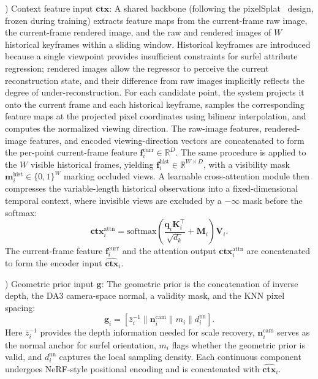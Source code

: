 \documentclass[letterpaper,journal]{IEEEtran}
\begin{document}
\vspace{0.35em}
) Context feature input $\mathbf{ctx}$: A shared backbone (following the pixelSplat~\cite{charatan2024pixelsplat} design, frozen during training) extracts feature maps from the current-frame raw image, the current-frame rendered image, and the raw and rendered images of $W$ historical keyframes within a sliding window. Historical keyframes are introduced because a single viewpoint provides insufficient constraints for surfel attribute regression; rendered images allow the regressor to perceive the current reconstruction state, and their difference from raw images implicitly reflects the degree of under-reconstruction. For each candidate point, the system projects it onto the current frame and each historical keyframe, samples the corresponding feature maps at the projected pixel coordinates using bilinear interpolation, and computes the normalized viewing direction. The raw-image features, rendered-image features, and encoded viewing-direction vectors are concatenated to form the per-point current-frame feature $\mathbf{f}_i^{\text{curr}} \in \mathbb{R}^{D}$. The same procedure is applied to the $W$ visible historical frames, yielding $\mathbf{f}_i^{\text{hist}} \in \mathbb{R}^{W \times D}$, with a visibility mask $\mathbf{m}_i^{\text{hist}} \in \{0,1\}^{W}$ marking occluded views. A learnable cross-attention module then compresses the variable-length historical observations into a fixed-dimensional temporal context, where invisible views are excluded by a $-\infty$ mask before the softmax:
%
\begin{equation}
\mathbf{ctx}_i^{\text{attn}} = \text{softmax}\!\left(\frac{\mathbf{q}_i \mathbf{K}_i^\top}{\sqrt{d_k}} + \mathbf{M}_i\right) \mathbf{V}_i.
\end{equation}
%
The current-frame feature $\mathbf{f}_i^{\text{curr}}$ and the attention output $\mathbf{ctx}_i^{\text{attn}}$ are concatenated to form the encoder input $\hat{\mathbf{ctx}}_i$.

\vspace{0.35em}
) Geometric prior input $\mathbf{g}$: The geometric prior is the concatenation of inverse depth, the DA3 camera-space normal, a validity mask, and the KNN pixel spacing:
%
\begin{equation}
\mathbf{g}_i = [\bar{z}_i^{-1} \| \mathbf{n}_i^{\text{cam}} \| m_i \| d_i^{\text{nn}}].
\end{equation}
%
Here $\bar{z}_i^{-1}$ provides the depth information needed for scale recovery, $\mathbf{n}_i^{\text{cam}}$ serves as the normal anchor for surfel orientation, $m_i$ flags whether the geometric prior is valid, and $d_i^{\text{nn}}$ captures the local sampling density. Each continuous component undergoes NeRF-style positional encoding and is concatenated with $\hat{\mathbf{ctx}}_i$.
\end{document}
